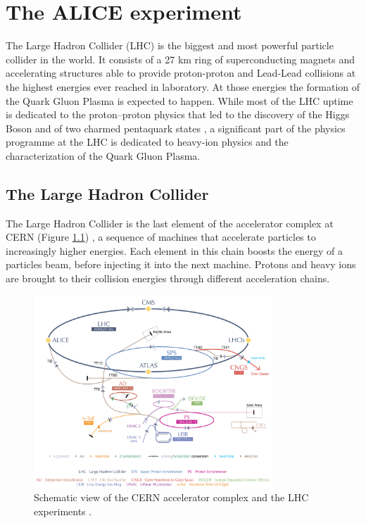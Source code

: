 %
\chapter{The ALICE experiment}
\label{sec:3}


The Large Hadron Collider (LHC) is the biggest and most powerful particle collider in the world.
It consists of a 27 km ring of superconducting magnets and accelerating structures able to
provide proton-proton and Lead-Lead collisions at the highest energies ever reached in laboratory. At those energies the formation of the Quark Gluon Plasma is expected to happen.
While most of the LHC uptime is dedicated to the proton–proton physics that led to the discovery of 
the Higgs Boson \cite{atlashiggs,cmshiggs} and of two charmed pentaquark states \cite{lhcbpenta}, 
a significant part of the physics programme at the LHC is dedicated to heavy-ion physics and the 
characterization of the Quark Gluon Plasma.

\section{The Large Hadron Collider} \label{sec:3.1}

The Large Hadron Collider is the last element of the accelerator complex at CERN (Figure \ref{fig:lhc})
, a sequence of machines that accelerate particles to increasingly higher energies. Each element in
this chain boosts the energy of a particles beam, before injecting it into the next machine. 
Protons and heavy ions are brought to their collision energies through different acceleration chains.

\begin{figure}
    \centering
    \includegraphics[width=0.8\textwidth]{gfx/lhc}
	\caption{Schematic view of the CERN accelerator complex and the LHC experiments \cite{lhc}.}
	\label{fig:lhc}
\end{figure}

